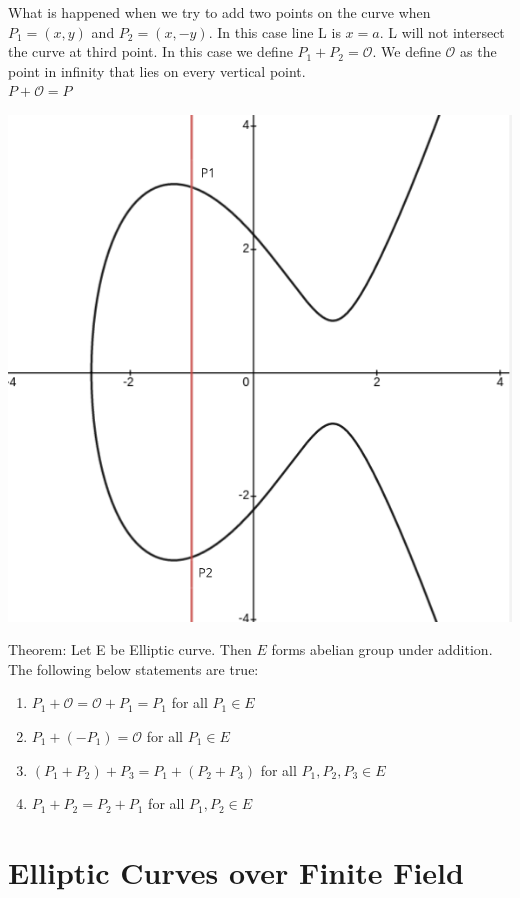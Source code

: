 \documentclass[12pt,a4paper]{report}
\begin{document}
What is happened when we try to add two points on the curve when $P_1=(x,y)$ and $P_2=(x,-y)$. In this case line L is $x=a$. L will not intersect the curve at third point. In this case we define 
$ P_1+P_2= \mathscr{O} $. We define $\mathscr{O}$  as the point in infinity that lies on every vertical point.\\$P+\mathscr{O}=P$
\begin{center}
\includegraphics[scale=0.4]{1}
\end{center}
Theorem: Let E be Elliptic curve. Then $E$ forms abelian group under addition. The following below statements are true:
 \begin{enumerate}
 \item $P_1+\mathscr{O}=\mathscr{O}+P_1=P_1$ for all $P_1 \in E$
 \item $P_1+(-P_1)=\mathscr{O}$ for all $P_1 \in E$
 \item $(P_1+P_2)+P_3=P_1+(P_2+P_3)$ for all $P_1,P_2,P_3 \in E$
 \item $P_1+P_2=P_2+P_1$ for all $P_1,P_2 \in E$
 \end{enumerate}
 

  \section{Elliptic Curves over Finite Field}
\end{document}
